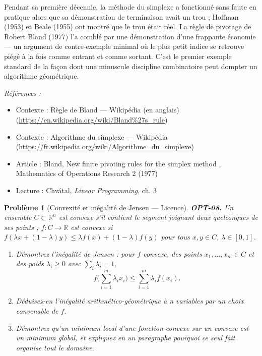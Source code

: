 \documentclass[11pt]{article}
\newtheorem{problem}{Problème}
\newenvironment{refs}{\par\small\noindent\emph{Références :}\begin{itemize}\setlength\itemsep{0pt}}{\end{itemize}\normalsize}
\begin{document}
\noindent Pendant sa première décennie, la méthode du simplexe a fonctionné sans faute en pratique alors que sa démonstration de terminaison avait un trou ; Hoffman (1953) et Beale (1955) ont montré que le trou était réel. La règle de pivotage de Robert Bland (1977) l'a comblé par une démonstration d'une frappante économie --- un argument de contre-exemple minimal où le plus petit indice se retrouve piégé à la fois comme entrant et comme sortant. C'est le premier exemple standard de la façon dont une minuscule discipline combinatoire peut dompter un algorithme géométrique.

\begin{refs}
\item Contexte : Règle de Bland --- Wikipédia (en anglais) (\url{https://en.wikipedia.org/wiki/Bland%27s_rule})
\item Contexte : Algorithme du simplexe --- Wikipédia (\url{https://fr.wikipedia.org/wiki/Algorithme_du_simplexe})
\item Article : Bland, \og{} New finite pivoting rules for the simplex method \fg{}, Mathematics of Operations Research 2 (1977)
\item Lecture : Chvátal, \textit{Linear Programming}, ch. 3
\end{refs}

\bigskip

\begin{problem}[{Convexité et inégalité de Jensen --- Licence}]
\textbf{OPT-08.} Un ensemble $C \subset \mathbb{R}^n$ est convexe s'il contient le segment joignant deux quelconques de ses points ; $f : C \to \mathbb{R}$ est convexe si $f(\lambda x + (1-\lambda)y) \le \lambda f(x) + (1-\lambda)f(y)$ pour tous $x, y \in C$, $\lambda \in [0,1]$.
\begin{enumerate}
\item[(a)] Démontrez l'inégalité de Jensen : pour $f$ convexe, des points $x_1, \dots, x_m \in C$ et des poids $\lambda_i \ge 0$ avec $\sum_i \lambda_i = 1$,
\[ f\Big(\sum_{i=1}^m \lambda_i x_i\Big) \le \sum_{i=1}^m \lambda_i f(x_i). \]
\item[(b)] Déduisez-en l'inégalité arithmético-géométrique à n variables par un choix convenable de $f$.
\item[(c)] Démontrez qu'un minimum local d'une fonction convexe sur un convexe est un minimum global, et expliquez en un paragraphe pourquoi ce seul fait organise tout le domaine.
\end{enumerate}

\end{problem}
\end{document}
